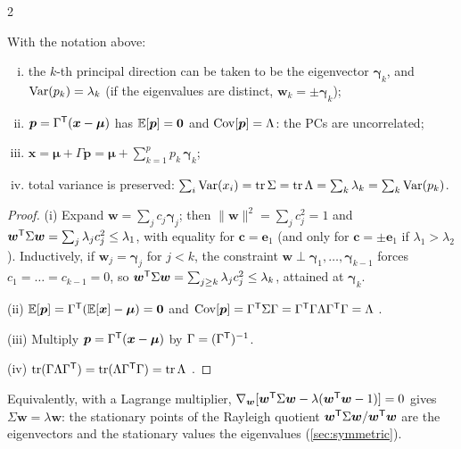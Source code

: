 \begin{paracol}{2}
\begin{theorem}\label{ch07:thm-pca}
With the notation above:
\begin{enumerate}[(i)]
  \item the $k$-th principal direction can be taken to be the eigenvector $\bm\gamma_k$, and
        $\operatorname{Var}(p_k)=\lambda_k$ (if the eigenvalues are distinct, $\bm w_k=\pm\bm\gamma_k$);
  \item $\bm p=\Gamma^{\mathsf T}(\bm x-\bm\mu)$ has $\mathbb{E}[\bm p]=\bm 0$ and $\operatorname{Cov}[\bm p]=\Lambda$: the PCs are uncorrelated;
  \item $\bm x=\bm\mu+\Gamma\bm p=\bm\mu+\sum_{k=1}^p p_k\,\bm\gamma_k$;
  \item total variance is preserved: $\sum_i\operatorname{Var}(x_i)=\operatorname{tr}\Sigma=\operatorname{tr}\Lambda=\sum_k\lambda_k=\sum_k\operatorname{Var}(p_k)$.
\end{enumerate}
\end{theorem}
\begin{proof}
(i) Expand $\bm w=\sum_jc_j\bm\gamma_j$; then $\|\bm w\|^2=\sum_jc_j^2=1$ and $\bm w^{\mathsf T}\Sigma\bm w=\sum_j\lambda_jc_j^2\le\lambda_1$,
with equality for $\bm c=\bm e_1$ (and only for $\bm c=\pm\bm e_1$ if $\lambda_1>\lambda_2$). Inductively, if
$\bm w_j=\bm\gamma_j$ for $j<k$, the constraint $\bm w\perp\bm\gamma_1,\dots,\bm\gamma_{k-1}$ forces $c_1=\dots=c_{k-1}=0$, so
$\bm w^{\mathsf T}\Sigma\bm w=\sum_{j\ge k}\lambda_jc_j^2\le\lambda_k$, attained at $\bm\gamma_k$.

(ii) $\mathbb{E}[\bm p]=\Gamma^{\mathsf T}(\mathbb{E}[\bm x]-\bm\mu)=\bm 0$ and $\operatorname{Cov}[\bm p]=\Gamma^{\mathsf T}\Sigma\Gamma=\Gamma^{\mathsf T}\Gamma\Lambda\Gamma^{\mathsf T}\Gamma=\Lambda$
.

(iii) Multiply $\bm p=\Gamma^{\mathsf T}(\bm x-\bm\mu)$ by $\Gamma=(\Gamma^{\mathsf T})^{-1}$.

(iv) $\operatorname{tr}(\Gamma\Lambda\Gamma^{\mathsf T})=\operatorname{tr}(\Lambda\Gamma^{\mathsf T}\Gamma)=\operatorname{tr}\Lambda$ .
\end{proof}

Equivalently, with a Lagrange multiplier, $\nabla_{\bm w}[\bm w^{\mathsf T}\Sigma\bm w-\lambda(\bm w^{\mathsf T}\bm w-1)]=0$ gives
$\Sigma\bm w=\lambda\bm w$: the stationary points of the Rayleigh quotient $\bm w^{\mathsf T}\Sigma\bm w/\bm w^{\mathsf T}\bm w$ are the
eigenvectors and the stationary values the eigenvalues (\cref{sec:symmetric}).


\end{paracol}

